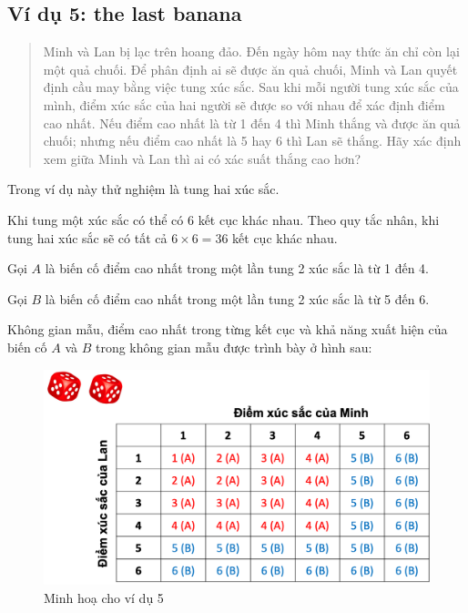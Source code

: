 \documentclass[
]{book}
\begin{document}
\hypertarget{vuxed-dux1ee5-5-the-last-banana}{%
\subsection{Ví dụ 5: the last banana}\label{vuxed-dux1ee5-5-the-last-banana}}

\begin{quote}
Minh và Lan bị lạc trên hoang đảo. Đến ngày hôm nay thức ăn chỉ còn lại một quả chuối. Để phân định ai sẽ được ăn quả chuối, Minh và Lan quyết định cầu may bằng việc tung xúc sắc. Sau khi mỗi người tung xúc sắc của mình, điểm xúc sắc của hai người sẽ được so với nhau để xác định điểm cao nhất. Nếu điểm cao nhất là từ 1 đến 4 thì Minh thắng và được ăn quả chuối; nhưng nếu điểm cao nhất là 5 hay 6 thì Lan sẽ thắng. Hãy xác định xem giữa Minh và Lan thì ai có xác suất thắng cao hơn?
\end{quote}

Trong ví dụ này thử nghiệm là tung hai xúc sắc.

Khi tung một xúc sắc có thể có 6 kết cục khác nhau. Theo quy tắc nhân, khi tung hai xúc sắc sẽ có tất cả \(6 \times 6 = 36\) kết cục khác nhau.

Gọi \(A\) là biến cố điểm cao nhất trong một lần tung 2 xúc sắc là từ 1 đến 4.

Gọi \(B\) là biến cố điểm cao nhất trong một lần tung 2 xúc sắc là từ 5 đến 6.

Không gian mẫu, điểm cao nhất trong từng kết cục và khả năng xuất hiện của biến cố \(A\) và \(B\) trong không gian mẫu được trình bày ở hình sau:

\begin{figure}

{\centering \includegraphics[width=1\linewidth]{figures/Picture04} 

}

\caption{Minh hoạ cho ví dụ 5}\label{fig:example5}
\end{figure}
\end{document}
